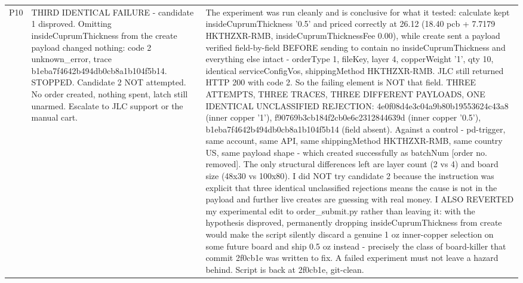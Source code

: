 \documentclass[11pt,a4paper]{article}
\begin{document}
{\begin{longtable}{lp{5.2cm}p{7.2cm}}
P10 & THIRD IDENTICAL FAILURE - candidate 1 disproved. Omitting insideCuprumThickness from the create payload changed nothing: code 2 unknown\_error, trace b1eba7f4642b494db0cb8a1b104f5b14. STOPPED. Candidate 2 NOT attempted. No order created, nothing spent, latch still unarmed. Escalate to JLC support or the manual cart. & The experiment was run cleanly and is conclusive for what it tested: calculate kept insideCuprumThickness '0.5' and priced correctly at 26.12 (18.40 pcb + 7.7179 HKTHZXR-RMB, insideCuprumThicknessFee 0.00), while create sent a payload verified field-by-field BEFORE sending to contain no insideCuprumThickness and everything else intact - orderType 1, fileKey, layer 4, copperWeight '1', qty 10, identical serviceConfigVos, shippingMethod HKTHZXR-RMB. JLC still returned HTTP 200 with code 2. So the failing element is NOT that field. THREE ATTEMPTS, THREE TRACES, THREE DIFFERENT PAYLOADS, ONE IDENTICAL UNCLASSIFIED REJECTION: 4e0f08d4e3c04a9b80b19553624c43a8 (inner copper '1'), f90769b3cb184f2cb0e6c2312844639d (inner copper '0.5'), b1eba7f4642b494db0cb8a1b104f5b14 (field absent). Against a control - pd-trigger, same account, same API, same shippingMethod HKTHZXR-RMB, same country US, same payload shape - which created successfully as batchNum [order no. removed]. The only structural differences left are layer count (2 vs 4) and board size (48x30 vs 100x80). I did NOT try candidate 2 because the instruction was explicit that three identical unclassified rejections means the cause is not in the payload and further live creates are guessing with real money. I ALSO REVERTED my experimental edit to order\_submit.py rather than leaving it: with the hypothesis disproved, permanently dropping insideCuprumThickness from create would make the script silently discard a genuine 1 oz inner-copper selection on some future board and ship 0.5 oz instead - precisely the class of board-killer that commit 2f0cb1e was written to fix. A failed experiment must not leave a hazard behind. Script is back at 2f0cb1e, git-clean. \\

\end{longtable}}
\end{document}
